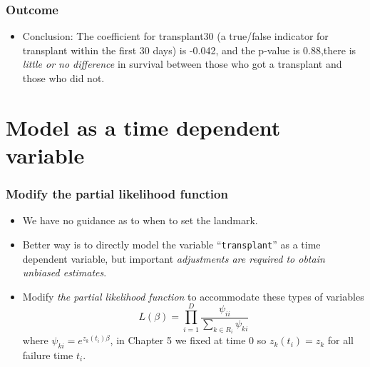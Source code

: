 \documentclass{beamer}
\newcommand{\empr}[1]{{\emph{\color{red}#1}}}
\begin{document}
\pagebreak
\begin{frame}[fragile]
\frametitle{Outcome}
\begin{itemize}
\begin{Verbatim}
> ind30 <- jasa$futime >= 30
> transplant30 <- \{\{jasa$transplant == 1\}\&\{jasa$wait.time < 30\}\}
> summary(coxph(Surv(futime, fustat)~transplant30 + age 
+ surgery, data=jasa, subset=ind30))
  n= 79, number of events= 52
                     coef   exp(coef)  se(coef)    z    Pr(>|z|)
transplant30TRUE  -0.04214  0.95874    0.28377  -0.148  0.8820 
age                0.03720  1.03790    0.01714   2.170  0.0300 *    
surgery           -0.81966  0.44058    0.41297  -1.985  0.0472 *
Signif. codes: 0 *** 0.001 ** 0.01 * 0.05 . 0.1 
\end{Verbatim}
\item Conclusion: The coefficient for transplant30 (a true/false indicator for transplant within the first 30 days) is -0.042, and the p-value is 0.88,there is \empr{little or no difference} in survival between those who got a transplant and those who did not.
\end{itemize}
\end{frame}

\section{Model as a time dependent variable}
\begin{frame}
\frametitle{Modify the partial likelihood function}
\begin{itemize}
\item We have no guidance as to when to set the landmark.
\item Better way is to directly model the variable ``\texttt{transplant}'' as a time dependent variable, but important \empr{adjustments are required to obtain unbiased estimates}.
\item Modify \empr{the partial likelihood function} to accommodate these types of variables
\begin{equation}
L(\beta) = \prod\limits_{i=1}^{D}\frac{\psi_{ii}}{\sum\limits_{k\in R_i}^{}\psi_{ki}}
\end{equation}
where $\psi_{ki} = e^{z_k(t_i)\beta}$, in Chapter 5 we fixed at time 0 so $z_k(t_i)=z_k$ for all failure time $t_i$.
\end{itemize}
\end{frame}
\end{document}
